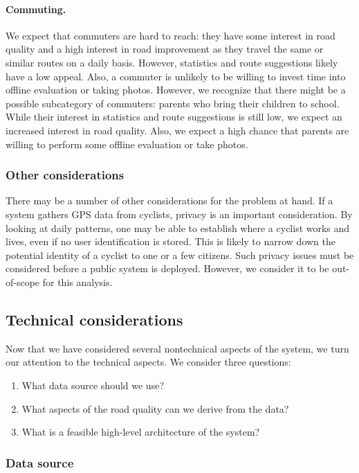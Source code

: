 \documentclass[a4paper,11pt]{article}
\begin{document}
\paragraph{Commuting.}
We expect that commuters are hard to reach: 
they have some interest in road quality and a high interest in 
road improvement as they travel the same or similar routes on a daily basis. 
However, statistics and route suggestions likely have a low appeal. 
Also, a commuter is unlikely to be willing to invest time into offline evaluation or taking photos.
However, we recognize that there might be a possible subcategory of commuters: parents who bring 
their children to school. While their interest in statistics and route suggestions is still low, we expect 
an increased interest in road quality. Also, we expect a high chance that parents are willing to perform some 
offline evaluation or take photos.

\subsubsection{Other considerations}

There may be a number of other considerations for the problem at hand. 
If a system gathers GPS data from cyclists, privacy is an important consideration. 
By looking at daily patterns, one may be able to establish where a cyclist works and lives, 
even if no user identification is stored. This is likely to narrow down the potential identity 
of a cyclist to one or a few citizens. Such privacy issues must be considered before a 
public system is deployed. However, we consider it to be out-of-scope for this analysis.

\subsection{Technical considerations}

Now that we have considered several nontechnical aspects of the system, 
we turn our attention to the technical aspects. We consider three questions:
\begin{enumerate}\setlength{\itemsep}{-3pt}
\item What data source should we use?
\item What aspects of the road quality can we derive from the data?
\item What is a feasible high-level architecture of the system?
\end{enumerate}

\subsubsection{Data source}
\label{ssec:datasource}
\end{document}
